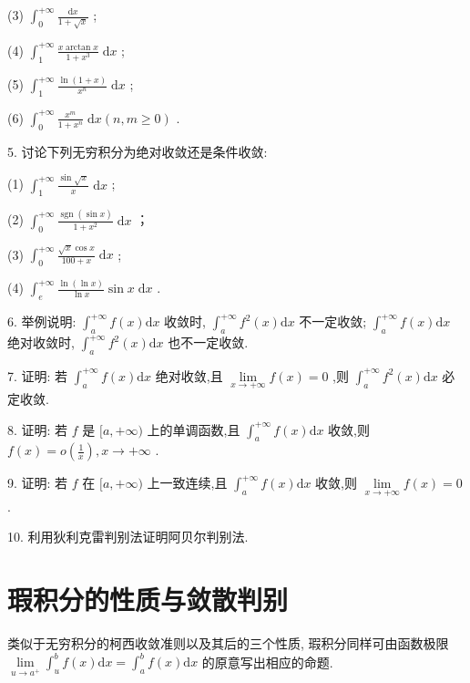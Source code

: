 (3) \({\int }_{0}^{+\infty }\frac{\mathrm{d}x}{1 + \sqrt{x}}\) ;

(4) \({\int }_{1}^{+\infty }\frac{x\arctan x}{1 + {x}^{3}}\mathrm{\;d}x\) ;

(5) \({\int }_{1}^{+\infty }\frac{\ln \left( {1 + x}\right) }{{x}^{n}}\mathrm{\;d}x\) ;

(6) \({\int }_{0}^{+\infty }\frac{{x}^{m}}{1 + {x}^{n}}\mathrm{\;d}x\left( {n,m \geq  0}\right)\) .

5. 讨论下列无穷积分为绝对收敛还是条件收敛:

(1) \({\int }_{1}^{+\infty }\frac{\sin \sqrt{x}}{x}\mathrm{\;d}x\) ;

(2) \({\int }_{0}^{+\infty }\frac{\operatorname{sgn}\left( {\sin x}\right) }{1 + {x}^{2}}\mathrm{\;d}x\) ；

(3) \({\int }_{0}^{+\infty }\frac{\sqrt{x}\cos x}{{100} + x}\mathrm{\;d}x\) ;

(4) \({\int }_{e}^{+\infty }\frac{\ln \left( {\ln x}\right) }{\ln x}\sin x\mathrm{\;d}x\) .

6. 举例说明: \({\int }_{a}^{+\infty }f\left( x\right) \mathrm{d}x\) 收敛时, \({\int }_{a}^{+\infty }{f}^{2}\left( x\right) \mathrm{d}x\) 不一定收敛; \({\int }_{a}^{+\infty }f\left( x\right) \mathrm{d}x\) 绝对收敛时, \({\int }_{a}^{+\infty }{f}^{2}\left( x\right) \mathrm{d}x\) 也不一定收敛.

7. 证明: 若 \({\int }_{a}^{+\infty }f\left( x\right) \mathrm{d}x\) 绝对收敛,且 \(\mathop{\lim }\limits_{{x \rightarrow   + \infty }}f\left( x\right)  = 0\) ,则 \({\int }_{a}^{+\infty }{f}^{2}\left( x\right) \mathrm{d}x\) 必定收敛.

8. 证明: 若 \(f\) 是 \(\lbrack a, + \infty )\) 上的单调函数,且 \({\int }_{a}^{+\infty }f\left( x\right) \mathrm{d}x\) 收敛,则 \(f\left( x\right)  = o\left( \frac{1}{x}\right) ,x \rightarrow   + \infty\) .

9. 证明: 若 \(f\) 在 \(\lbrack a, + \infty )\) 上一致连续,且 \({\int }_{a}^{+\infty }f\left( x\right) \mathrm{d}x\) 收敛,则 \(\mathop{\lim }\limits_{{x \rightarrow   + \infty }}f\left( x\right)  = 0\) .

10. 利用狄利克雷判别法证明阿贝尔判别法.

\section{瑕积分的性质与敛散判别}

类似于无穷积分的柯西收敛准则以及其后的三个性质, 瑕积分同样可由函数极限 \(\mathop{\lim }\limits_{{u \rightarrow  {a}^{ + }}}{\int }_{u}^{b}f\left( x\right) \mathrm{d}x = {\int }_{a}^{b}f\left( x\right) \mathrm{d}x\) 的原意写出相应的命题.

